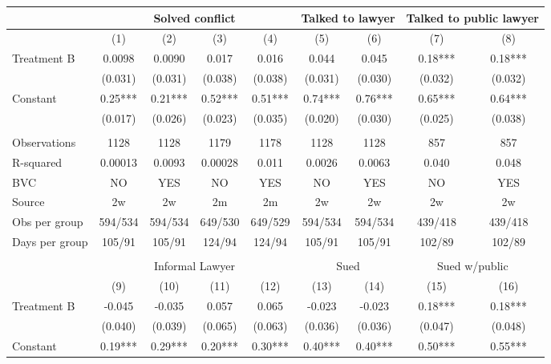\begin{tabular}{lcccccccc}
\toprule
      & \multicolumn{4}{c}{Solved conflict} & \multicolumn{2}{c}{Talked to lawyer} & \multicolumn{2}{c}{Talked to public lawyer} \\
\midrule
\midrule
      & (1)   & (2)   & (3)   & (4)   & (5)   & (6)   & (7)   & (8) \\
\midrule
\midrule
Treatment B & 0.0098 & 0.0090 & 0.017 & 0.016 & 0.044 & 0.045 & 0.18*** & 0.18*** \\
      & (0.031) & (0.031) & (0.038) & (0.038) & (0.031) & (0.030) & (0.032) & (0.032) \\
Constant  & 0.25*** & 0.21*** & 0.52*** & 0.51*** & 0.74*** & 0.76*** & 0.65*** & 0.64*** \\
      & (0.017) & (0.026) & (0.023) & (0.035) & (0.020) & (0.030) & (0.025) & (0.038) \\
      &       &       &       &       &       &       &       &  \\
\midrule
Observations & 1128  & 1128  & 1179  & 1178  & 1128  & 1128  & 857   & 857 \\
R-squared & 0.00013 & 0.0093 & 0.00028 & 0.011 & 0.0026 & 0.0063 & 0.040 & 0.048 \\
BVC   & NO    & YES   & NO    & YES   & NO    & YES   & NO    & YES \\
Source & 2w    & 2w    & 2m    & 2m    & 2w    & 2w    & 2w    & 2w \\
Obs per group & 594/534 & 594/534 & 649/530 & 649/529 & 594/534 & 594/534 & 439/418 & 439/418 \\
Days per group & 105/91 & 105/91 & 124/94 & 124/94 & 105/91 & 105/91 & 102/89 & 102/89 \\
\midrule
\midrule
      &       &       &       &       &       &       &       &  \\
\midrule
      & \multicolumn{4}{c}{Informal Lawyer} & \multicolumn{2}{c}{Sued} & \multicolumn{2}{c}{Sued w/public} \\
\midrule
\midrule
      & (9)   & (10)  & (11)  & (12)  & (13)  & (14)  & (15)  & (16) \\
\midrule
\midrule
Treatment B & -0.045 & -0.035 & 0.057 & 0.065 & -0.023 & -0.023 & 0.18*** & 0.18*** \\
      & (0.040) & (0.039) & (0.065) & (0.063) & (0.036) & (0.036) & (0.047) & (0.048) \\
Constant  & 0.19*** & 0.29*** & 0.20*** & 0.30*** & 0.40*** & 0.40*** & 0.50*** & 0.55*** \\

\end{tabular}
